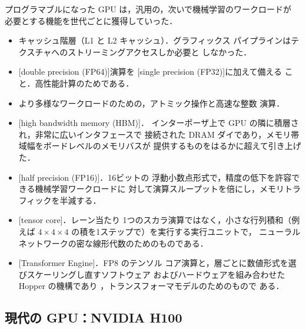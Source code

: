 \documentclass[../main.tex]{subfiles}
\begin{document}
プログラマブルになった GPU は，汎用の，次いで機械学習のワークロードが
必要とする機能を世代ごとに獲得していった．
\begin{itemize}
  \item キャッシュ階層（L1 と L2 キャッシュ）．グラフィックス
    パイプラインはテクスチャへのストリーミングアクセスしか必要と
    しなかった．
  \item {}[double precision (FP64)]演算を
    [single precision (FP32)]に加えて備える
    こと．高性能計算のためである．
  \item より多様なワークロードのための，アトミック操作と高速な整数
    演算．
  \item {}[high bandwidth memory (HBM)]．
    インターポーザ上で GPU の隣に積層され，非常に広いインタフェースで
    接続された DRAM ダイであり，メモリ帯域幅をボードレベルのメモリバスが
    提供するものをはるかに超えて引き上げた．
  \item {}[half precision (FP16)]．16ビットの
    浮動小数点形式で，精度の低下を許容できる機械学習ワークロードに
    対して演算スループットを倍にし，メモリトラフィックを半減する．
  \item {}[tensor core]．レーン当たり
    1つのスカラ演算ではなく，小さな行列積和（例えば
    $4 \times 4 \times 4$ の積を1ステップで）を実行する実行ユニットで，
    ニューラルネットワークの密な線形代数のためのものである．
  \item {}[Transformer Engine]．FP8 のテンソル
    コア演算と，層ごとに数値形式を選びスケーリングし直すソフトウェア
    およびハードウェアを組み合わせた Hopper の機構であり
    \cite{nvidia2022hopper}，トランスフォーマモデルのためのもので
    ある．
\end{itemize}

\subsection{現代の GPU：NVIDIA H100}
\end{document}
